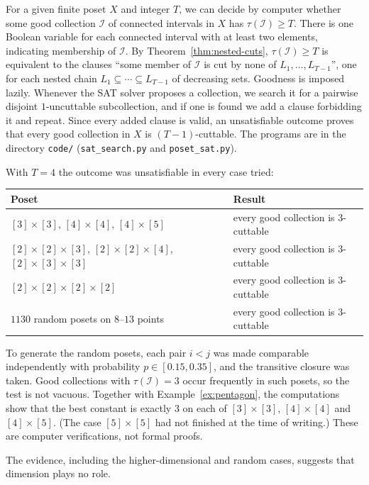\documentclass[10pt, a4paper]{article}
\theoremstyle{plain}
\theoremstyle{definition}
\newcommand{\I}{\mathcal{I}}
\begin{document}
For a given finite poset $X$ and integer $T$, we can decide by computer whether some
good collection $\I$ of connected intervals in $X$ has $\tau(\I)\ge T$. There is one
Boolean variable for each connected interval with at least two elements, indicating
membership of $\I$. By Theorem~\ref{thm:nested-cuts}, $\tau(\I)\ge T$ is equivalent
to the clauses ``some member of $\I$ is cut by none of $L_1,\ldots,L_{T-1}$'', one
for each nested chain $L_1\subseteq\cdots\subseteq L_{T-1}$ of decreasing sets.
Goodness is imposed lazily. Whenever the SAT solver proposes a collection, we search
it for a pairwise disjoint $1$-uncuttable subcollection, and if one is found we add a
clause forbidding it and repeat. Since every added clause is valid, an unsatisfiable
outcome proves that every good collection in $X$ is $(T-1)$-cuttable. The programs
are in the directory \texttt{code/} (\texttt{sat\_search.py} and
\texttt{poset\_sat.py}).

With $T=4$ the outcome was unsatisfiable in every case tried:
\begin{center}
  \begin{tabular}{ll}
    \hline
    Poset & Result \\
    \hline
    $[3]\times[3]$, $[4]\times[4]$, $[4]\times[5]$ & every good collection is $3$-cuttable \\
    $[2]\times[2]\times[3]$, $[2]\times[2]\times[4]$, $[2]\times[3]\times[3]$ & every good collection is $3$-cuttable \\
    $[2]\times[2]\times[2]\times[2]$ & every good collection is $3$-cuttable \\
    $1130$ random posets on $8$--$13$ points & every good collection is $3$-cuttable \\
    \hline
  \end{tabular}
\end{center}
To generate the random posets, each pair $i<j$ was made comparable independently with
probability $p\in[0.15,0.35]$, and the transitive closure was taken. Good collections with
$\tau(\I)=3$ occur frequently in such posets, so the test is not vacuous. Together
with Example~\ref{ex:pentagon}, the computations show that the best constant is
exactly $3$ on each of $[3]\times[3]$, $[4]\times[4]$ and $[4]\times[5]$. (The case
$[5]\times[5]$ had not finished at the time of writing.) These are computer
verifications, not formal proofs.

The evidence, including the higher-dimensional and random cases, suggests that
dimension plays no role.
\end{document}
